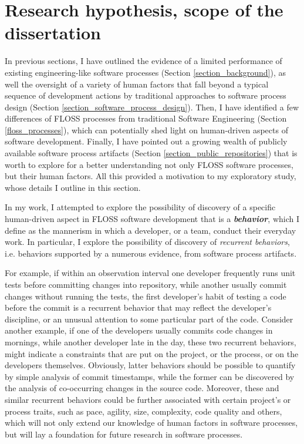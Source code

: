 %
%
\section{Research hypothesis, scope of the dissertation}\label{section_research_hypothesis}
In previous sections, I have outlined the evidence of a limited performance of existing engineering-like 
software processes (Section \ref{section_background}),
as well the oversight of a variety of human factors that fall beyond a typical sequence of development 
actions by traditional approaches to software process design (Section \ref{section_software_process_design}).
Then, I have identified a few differences of FLOSS processes from traditional Software Engineering 
(Section \ref{floss_processes}), which can potentially shed light on human-driven aspects of software development.
Finally, I have pointed out a growing wealth of publicly available software process artifacts 
(Section \ref{section_public_repositories}) that is worth to explore for a better understanding not only 
FLOSS software processes, but their human factors. All this provided a motivation to my exploratory study, 
whose details I outline in this section.

In my work, I attempted to explore the possibility of discovery of a specific human-driven aspect in 
FLOSS software development that is a \textit{\textbf{behavior}}, which I define as the mannerism in which a 
developer, or a team, conduct their everyday work. 
In particular, I explore the possibility of discovery of \textit{recurrent behaviors}, i.e. behaviors supported 
by a numerous evidence, from software process artifacts. 

For example, if within an observation interval one developer frequently runs unit tests before committing 
changes into repository, while another usually commit changes without running the tests, the first developer's
habit of testing a code before the commit is a recurrent behavior that may reflect the developer's discipline,
or an unusual attention to some particular part of the code. 
Consider another example, if one of the developers usually commits code changes in mornings, while another 
developer late in the day, these two recurrent behaviors, might indicate a constraints that are put on the 
project, or the process, or on the developers themselves.
Obviously, latter behaviors should be possible to quantify by simple analysis of commit timestamps, while 
the former can be discovered by the analysis of co-occurring changes in the source code. 
Moreover, these and similar recurrent behaviors could be further associated with certain project's or process 
traits, such as pace, agility, size, complexity, code quality and others, which will not only extend our 
knowledge of human factors in software processes, but will lay a foundation for future research in software 
processes.

